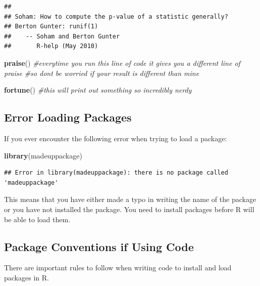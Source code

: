 \documentclass[
]{book}
\newenvironment{Shaded}{\begin{snugshade}}{\end{snugshade}}
\newcommand{\CommentTok}[1]{\textcolor[rgb]{0.56,0.35,0.01}{\textit{#1}}}
\newcommand{\FunctionTok}[1]{\textcolor[rgb]{0.13,0.29,0.53}{\textbf{#1}}}
\newcommand{\NormalTok}[1]{#1}
\begin{document}
\begin{verbatim}
## 
## Soham: How to compute the p-value of a statistic generally?
## Berton Gunter: runif(1)
##    -- Soham and Berton Gunter
##       R-help (May 2010)
\end{verbatim}

\begin{Shaded}
\begin{Highlighting}[]
\FunctionTok{praise}\NormalTok{() }\CommentTok{\#everytime you run this line of code it gives you a different line of praise}
\CommentTok{\#so don\textquotesingle{}t be worried if your result is different than mine}

\FunctionTok{fortune}\NormalTok{() }\CommentTok{\#this will print out something so incredibly nerdy }
\end{Highlighting}
\end{Shaded}

\hypertarget{error-loading-packages}{%
\subsection{Error Loading Packages}\label{error-loading-packages}}

If you ever encounter the following error when trying to load a package:

\begin{Shaded}
\begin{Highlighting}[]
\FunctionTok{library}\NormalTok{(madeuppackage)}
\end{Highlighting}
\end{Shaded}

\begin{verbatim}
## Error in library(madeuppackage): there is no package called 'madeuppackage'
\end{verbatim}

This means that you have either made a typo in writing the name of the package or you have not installed the package. You need to install packages before R will be able to load them.

\hypertarget{package-conventions-if-using-code}{%
\subsection{Package Conventions if Using Code}\label{package-conventions-if-using-code}}

There are important rules to follow when writing code to install and load packages in R.
\end{document}
